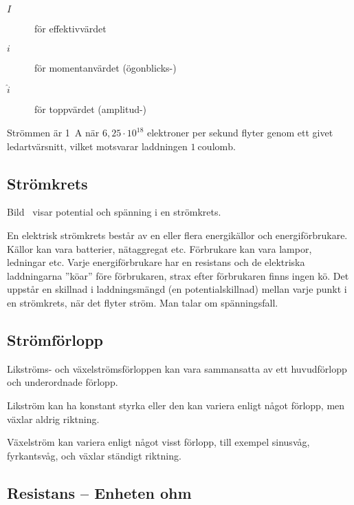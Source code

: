 \begin{description}
\item[\(I\)] för effektivvärdet
\item[\(i\)] för momentanvärdet (ögonblicks-)
\item[\(\hat{i}\)] för toppvärdet (amplitud-)
\end{description}

Strömmen är \qty{1}{\ampere} när \(6,25 \cdot 10^{18}\) elektroner per sekund
flyter genom ett givet ledartvärsnitt, vilket motsvarar laddningen
\(1\ \mathrm{coulomb}\).

\subsection{Strömkrets}
\label{strömkrets}


Bild~ visar potential och spänning i en strömkrets.

En elektrisk strömkrets består av en eller flera energikällor och
energiförbrukare.
Källor kan vara batterier, nätaggregat etc.
Förbrukare kan vara lampor, ledningar etc.
Varje energiförbrukare har en resistans och de elektriska laddningarna ''köar''
före förbrukaren, strax efter förbrukaren finns ingen kö.
Det uppstår en skillnad i laddningsmängd (en potentialskillnad) mellan varje
punkt i en strömkrets, när det flyter ström.
Man talar om spänningsfall.

\subsection{Strömförlopp}

Likströms- och växelströmsförloppen kan vara sammansatta av ett huvudförlopp och
underordnade förlopp.

Likström kan ha konstant styrka eller den kan variera enligt något förlopp, men
växlar aldrig riktning.

Växelström kan variera enligt något visst förlopp, till exempel sinusvåg,
fyrkantsvåg, och växlar ständigt riktning.

\subsection{Resistans -- Enheten ohm}
\label{resistans}

